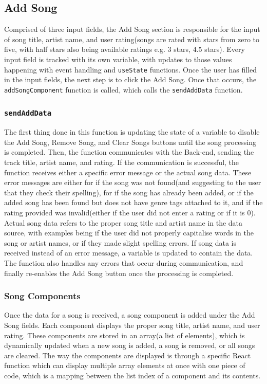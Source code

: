 \documentclass{l4proj}
\begin{document}
\subsection{Add Song}
Comprised of three input fields, the Add Song section is responsible for the input of song title, artist name, and user rating(songs are rated with stars from zero to five, with half stars also being available ratings e.g. 3 stars, 4.5 stars). Every input field is tracked with its own variable, with updates to those values happening with event handling and \texttt{useState} functions. Once the user has filled in the input fields, the next step is to click the Add Song. Once that occurs, the \texttt{addSongComponent} function is called, which calls the \texttt{sendAddData} function.
\subsubsection{\texttt{sendAddData}}
The first thing done in this function is updating the state of a variable to disable the Add Song, Remove Song, and Clear Songs buttons until the song processing is completed. Then, the function communicates with the Back-end, sending the track title, artist name, and rating. If the communication is successful, the function receives either a specific error message or the actual song data. These error messages are either for if the song was not found(and suggesting to the user that they check their spelling), for if the song has already been added, or if the added song has been found but does not have genre tags attached to it, and if the rating provided was invalid(either if the user did not enter a rating or if it is 0). Actual song data refers to the proper song title and artist name in the data source, with examples being if the user did not properly capitalise words in the song or artist names, or if they made slight spelling errors. If song data is received instead of an error message, a variable is updated to contain the data. The function also handles any errors that occur during communication, and finally re-enables the Add Song button once the processing is completed.
\subsubsection{Song Components}
Once the data for a song is received, a song component is added under the Add Song fields. Each component displays the proper song title, artist name, and user rating. These components are stored in an array(a list of elements), which is dynamically updated when a new song is added, a song is removed, or all songs are cleared. The way the components are displayed is through a specific React function which can display multiple array elements at once with one piece of code, which is a mapping between the list index of a component and its contents.
\end{document}
